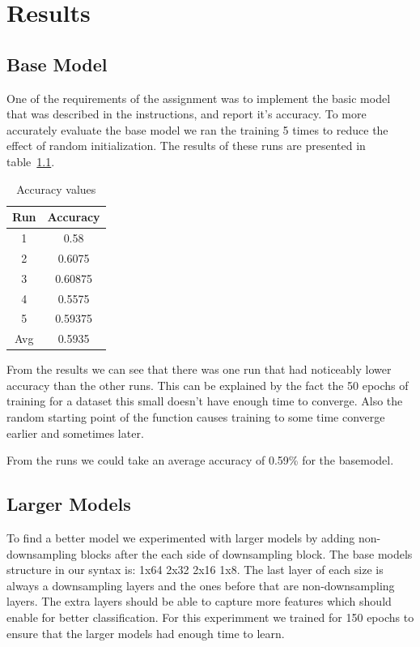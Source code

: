 \documentclass[12pt,a4paper,english
]{tunithesis}
\begin{document}
\chapter{Results}
\label{sec:results}

\section{Base Model}
One of the requirements of the assignment was to implement the basic model that was described in the instructions, and report it's accuracy. To more accurately evaluate the base model we ran the training 5 times to reduce the effect of random initialization. The results of these runs are presented in table~\ref{tab:basemodel}.

\begin{table}[h!]
\centering
\begin{tabular}{|c|c|}
\hline
Run & Accuracy \\
\hline
1 & 0.58 \\
2 & 0.6075 \\
3 & 0.60875 \\
4 & 0.5575 \\
5 & 0.59375 \\
\hline
Avg & 0.5935 \\
\hline
\end{tabular}
\caption{Accuracy values}
\label{tab:basemodel}
\end{table}

From the results we can see that there was one run that had noticeably lower accuracy than the other runs. This can be explained by the fact the 50 epochs of training for a dataset this small doesn't have enough time to converge. Also the random starting point of the function causes training to some time converge earlier and sometimes later.

From the runs we could take an average accuracy of 0.59\% for the basemodel.

\section{Larger Models}

To find a better model we experimented with larger models by adding non-downsampling blocks after the each side of downsampling block. The base models structure in our syntax is: 1x64 2x32 2x16 1x8. The last layer of each size is always a downsampling layers and the ones before that are non-downsampling layers. The extra layers should be able to capture more features which should enable for better classification. For this experimment we trained for 150 epochs to ensure that the larger models had enough time to learn.
\end{document}
